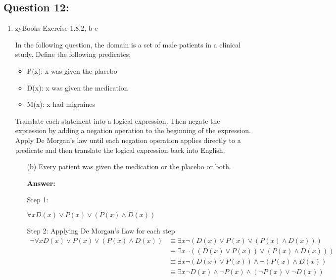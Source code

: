 \documentclass[12pt]{extreport}
\newcommand{\answer}[0]{\medskip \textbf{Answer:} \medskip}
\begin{document}
\subsection*{Question 12:}

\begin{enumerate}

    \item zyBooks Exercise 1.8.2, b-e
    
    In the following question, the domain is a set of male patients in a clinical study. Define the following predicates:

    \begin{itemize}
        \item P(x): x was given the placebo
        \item D(x): x was given the medication
        \item M(x): x had migraines
    \end{itemize}

    Translate each statement into a logical expression. Then negate the expression by adding a negation operation to the beginning of the expression. Apply De Morgan's law until each negation operation applies directly to a predicate and then translate the logical expression back into English. 
    
        \begin{enumerate}
            
            \item[(b)] Every patient was given the medication or the placebo or both.
            
                \answer

                Step 1:

                \( \forall x D(x) \lor P(x) \lor (P(x) \land D(x)) \)

                \medskip

                Step 2: Applying De Morgan's Law for each step
                \begin{align*}
                    \neg \forall x D(x) \lor P(x) \lor (P(x) \land D(x)) &\equiv \exists x \neg (D(x) \lor P(x) \lor (P(x) \land D(x))) \\
                        &\equiv \exists x \neg ((D(x) \lor P(x)) \lor (P(x) \land D(x))) \\
                        &\equiv \exists x \neg (D(x) \lor P(x)) \land \neg (P(x) \land D(x)) \\
                        &\equiv \exists x \neg D(x) \land \neg P(x) \land (\neg P(x) \lor \neg D(x)) \\
                \end{align*}


\end{enumerate}
\end{enumerate}
\end{document}
